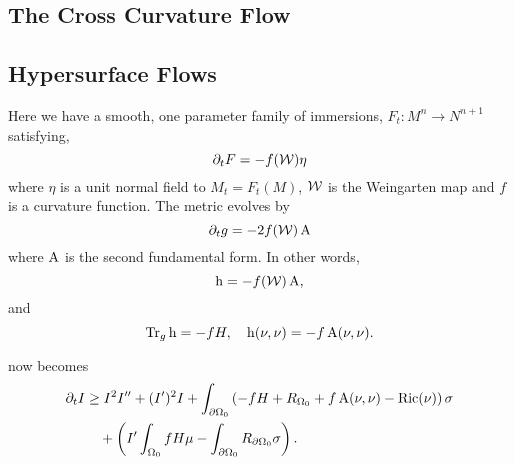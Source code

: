 \documentclass{amsart}
\begin{document}
\subsection{The Cross Curvature Flow}
\label{subsec:flows_xcf}

\subsection{Hypersurface Flows}
\label{subsec:flows_hypersurface}

Here we have a smooth, one parameter family of immersions, \(F_t : M^n \to N^{n+1}\) satisfying,
\[
\partial_t F = -f(\operatorname{\mathcal{W}}) \eta
\]
where \(\eta\) is a unit normal field to \(M_t = F_t(M)\), \(\operatorname{\mathcal{W}}\) is the Weingarten map and \(f\) is a curvature function. The metric evolves by
\[
\partial_t g = -2f(\operatorname{\mathcal{W}}) \operatorname{A}
\]
where \(\operatorname{A}\) is the second fundamental form. In other words,
\[
\operatorname{h} = -f(\operatorname{\mathcal{W}})\operatorname{A},
\]
and
\[
\operatorname{Tr}_g \operatorname{h} = -f H, \quad \operatorname{h} (\nu, \nu) = -f \operatorname{A}(\nu, \nu).
\]

 now becomes
\[
\begin{split}
\partial_t I &\geq I^2 I'' +  (I')^2 I + \int_{\partial {\Omega_0}} \left(-fH + R_{\Omega_0} + f\operatorname{A}(\nu, \nu) - \operatorname{Ric}(\nu)\right) \sigma \\
&\quad + \left(I'\int_{\Omega_0} fH \mu - \int_{\partial {\Omega_0}} R_{\partial {\Omega_0}}\sigma \right) .
\end{split}
\]

\printbibliography
\end{document}
